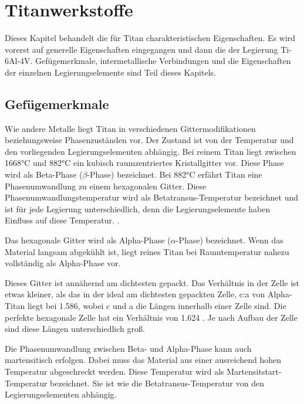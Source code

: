 \documentclass[a4paper, 11pt]{tubsreprt}
\begin{document}
\chapter{Titanwerkstoffe}
Dieses Kapitel behandelt die für Titan charakteristischen Eigenschaften. Es wird vorerst auf generelle Eigenschaften eingegangen und dann die der Legierung Ti-6Al-4V. Gefügemerkmale, intermetallische Verbindungen und die Eigenschaften der einzelnen Legierungselemente sind Teil dieses Kapitels.
\section{Gefügemerkmale}\label{Abschnitt Gefügemerkmale}
Wie andere Metalle liegt Titan in verschiedenen Gittermodifikationen beziehungsweise Phasenzuständen vor. Der Zustand ist von der Temperatur und den vorliegenden Legierungselementen abhängig. Bei reinem Titan liegt zwischen 1668°C und 882°C ein kubisch raumzentriertes Kristallgitter vor. Diese Phase wird als Beta-Phase ($\beta$-Phase) bezeichnet. Bei 882°C erfährt Titan eine Phasenumwandlung zu einem hexagonalen Gitter. Diese Phasenumwandlungstemperatur wird als Betatransus-Temperatur bezeichnet und ist für jede Legierung unterschiedlich, denn die Legierungselemente haben Einfluss auf diese Temperatur. \cite{Luetjering2007}.

Das hexagonale Gitter wird als Alpha-Phase ($\alpha$-Phase) bezeichnet. Wenn das Material langsam abgekühlt ist, liegt reines Titan bei Raumtemperatur nahezu vollständig als Alpha-Phase vor. 

Dieses Gitter ist annähernd am dichtesten gepackt. Das Verhältnis in der Zelle ist etwas kleiner, als das in der ideal am dichtesten gepackten Zelle, c:a von Alpha-Titan liegt bei 1.586, wobei c und a die Längen innerhalb einer Zelle sind. Die perfekte hexagonale Zelle hat ein Verhältnis von 1.624 \cite{Luetjering2007}. Je nach Aufbau der Zelle sind diese Längen unterschiedlich groß.

Die Phasenumwandlung zwischen Beta- und Alpha-Phase kann auch martensitisch erfolgen. Dabei muss das Material aus einer ausreichend hohen Temperatur abgeschreckt werden. Diese Temperatur wird als Martensitstart-Temperatur bezeichnet. Sie ist wie die Betatransus-Temperatur von den Legierungselementen abhängig.  
\end{document}
